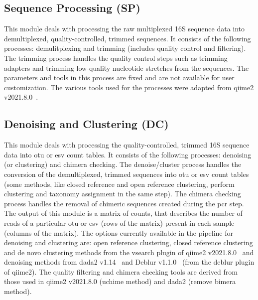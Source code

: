   \subsection*{Sequence Processing (SP)}
  This module deals with processing the raw multiplexed 16S sequence data into demultiplexed, quality-controlled, trimmed sequences.
  It consists of the following processes: demulitplexing and trimming (includes quality control and filtering).
  The trimming process handles the quality control steps such as trimming adapters and trimming low-quality nucleotide stretches from the sequences.
  The parameters and tools in this process are fixed and are not available for user customization.
  The various tools used for the processes were adapted from \ac{qiime2} v2021.8.0~\cite{bolyenReproducibleInteractiveScalable2019}.

  \subsection*{Denoising and Clustering (DC)}
  \vspace{-5mm}
  This module deals with processing the quality-controlled, trimmed 16S sequence data into \ac{otu} or \ac{esv} count tables.
  It consists of the following processes: denoising (or clustering) and chimera checking.
  The denoise/cluster process handles the conversion of the demultiplexed, trimmed sequences into \ac{otu} or \ac{esv} count tables (some methods, like closed reference and open reference clustering, perform clustering and taxonomy assignment in the same step).
  The chimera checking process handles the removal of chimeric sequences created during the \ac{pcr} step.
  The output of this module is a matrix of counts, that describes the number of reads of a particular \ac{otu} or \ac{esv} (rows of the matrix) present in each sample (columns of the matrix).
  The options currently available in the pipeline for denoising and clustering are: open reference clustering, closed reference clustering and de novo clustering methods from the vsearch plugin of \ac{qiime2} v2021.8.0~\cite{bolyenReproducibleInteractiveScalable2019} and denoising methods from \ac{dada2} v1.14~\cite{Callahan2016} and Deblur v1.1.0~\cite{Amir2017} (from the deblur plugin of \ac{qiime2}).
  The quality filtering and chimera checking tools are derived from those used in \ac{qiime2} v2021.8.0 (uchime method) and \ac{dada2} (remove bimera method).


